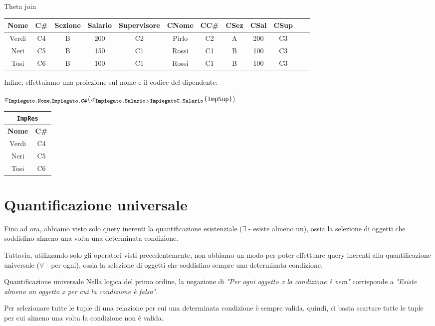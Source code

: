 \begin{Example}{Theta join}{}
\begin{center}
\begin{tabular}{|c|c|c|c|c|c|c|c|c|c|c|c|}
            \textbf{Nome} & \textbf{C\#} & \textbf{Sezione} & \textbf{Salario} & \textbf{Supervisore} & \textbf{CNome} &\textbf{ CC\#} & \textbf{CSez} & \textbf{CSal} & \textbf{CSup}
\\\hline
            Verdi & C4 & B & 200 & C2 & Pirlo & C2 & A & 200 & C3\\
            Neri & C5 & B & 150 & C1 & Rossi & C1 & B & 100 & C3\\
            Tosi & C6 & B & 100 & C1 & Rossi & C1 & B & 100 & C3\\\hline
        \end{tabular}
    \end{center}
    Infine, effettuiamo una proiezione sul nome e il codice del dipendente:
    \begin{center}
        $\pi_{\footnotesize\verb|Impiegato.Nome|, \verb|Impiegato.C#|}$($\sigma_{\footnotesize\verb|Impiegato.Salario| > \verb|ImpiegatoC.Salario|}$\verb|(ImpSup)|)
    \end{center}
    \begin{center}
        \begin{tabular}{|c|c|}
            \hline\multicolumn{2}{|c|}{\Verb|ImpRes|}\\\hline
            \textbf{Nome} & \textbf{C\#}\\\hline
            Verdi & C4\\
            Neri & C5\\
            Tosi & C6\\\hline
        \end{tabular}
    \end{center}
\end{Example}

\section{Quantificazione universale}
Fino ad ora, abbiamo visto solo query inerenti la quantificazione esistenziale ($\exists$ - esiste almeno un), ossia la selezione di oggetti che soddisfino almeno una volta una determinata condizione.

Tuttavia, utilizzando solo gli operatori visti precedentemente, non abbiamo un modo per poter effettuare query inerenti alla quantificazione universale ($\forall$ - per ogni), ossia la selezione di oggetti che soddisfino sempre una determinata condizione.

\begin{Osservation}{Quantificazione universale}{}
    Nella logica del primo ordine, la negazione di \textit{"Per ogni oggetto x la condizione è vera"} corrisponde a \textit{"Esiste almeno un oggetto x per cui la condizione è falsa"}.
    
    Per selezionare tutte le tuple di una relazione per cui una determinata condizione è sempre valida, quindi, ci basta scartare tutte le tuple per cui almeno una volta la condizione non è valida.
\end{Osservation}

